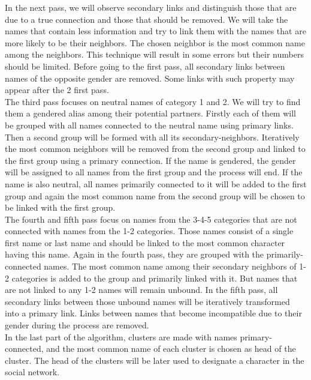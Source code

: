 \documentclass[a4paper, 12pt]{report}
\begin{document}
In the next pass, we will observe secondary links and distinguish those that are due to a true connection and those that should be removed.
We will take the names that contain less information and try to link them with the names that are more likely to be their neighbors.
The chosen neighbor is the most common name among the neighbors. This technique will result in some errors but their numbers should be limited.
Before going to the first pass, all secondary links between names of the opposite gender are removed. Some links with such property may appear after the 2 first pass.\\

The third pass focuses on neutral names of category 1 and 2. We will try to find them a gendered alias among their potential partners.
Firstly each of them will be grouped with all names connected to the neutral name using primary links. Then a second group will be formed with all its secondary-neighbors.
Iteratively the most common neighbors will be removed from the second group and linked to the first group using a primary connection.
If the name is gendered, the gender will be assigned to all names from the first group and the process will end.
If the name is also neutral, all names primarily connected to it will be added to the first group and again the most common name from the second group will be chosen to be linked with the first group.\\

The fourth and fifth pass focus on names from the 3-4-5 categories that are not connected with names from the 1-2 categories.
Those names consist of a single first name or last name and should be linked to the most common character having this name.
Again in the fourth pass, they are grouped with the primarily-connected names.
The most common name among their secondary neighbors of 1-2 categories is added to the group and primarily linked with it.
But names that are not linked to any 1-2 names will remain unbound.
In the fifth pass, all secondary links between those unbound names will be iteratively transformed into a primary link.
Links between names that become incompatible due to their gender during the process are removed.\\

In the last part of the algorithm, clusters are made with names primary-connected, and the most common name of each cluster is chosen as head of the cluster.
The head of the clusters will be later used to designate a character in the social network.
\end{document}
